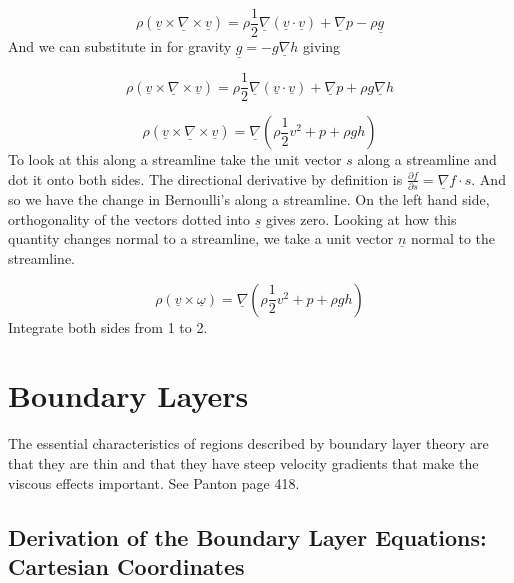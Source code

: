 \begin{equation*}
  \rho(\underline{v}\times\underline{\nabla}\times\underline{v})=\rho\frac{1}{2}\underline{\nabla}(\underline{v}\cdot\underline{v})+\underline{\nabla}p-\rho\underline{g}
\end{equation*}
And we can substitute in for gravity $\underline{g}=-g\underline{\nabla}h$ giving

\begin{equation*}
  \rho(\underline{v}\times\underline{\nabla}\times\underline{v})=\rho\frac{1}{2}\underline{\nabla}(\underline{v}\cdot\underline{v})+\underline{\nabla}p+\rho{}g\underline{\nabla}h
\end{equation*}

\begin{equation*}
  \rho(\underline{v}\times\underline{\nabla}\times\underline{v})=\underline{\nabla}\left(\rho\frac{1}{2}v^{2}+p+\rho{}gh\right)
\end{equation*}
To look at this along a streamline take the unit vector $s$ along a streamline and dot it onto both sides.
The directional derivative by definition is $\frac{\partial{}f}{\partial{}s}=\underline{\nabla}f\cdot s$.
And so we have the change in Bernoulli's along a streamline.
On the left hand side, orthogonality of the vectors dotted into $\underline{s}$ gives zero.
Looking at how this quantity changes normal to a streamline, we take a unit vector $\underline{n}$ normal to the streamline.

\begin{equation*}
  \rho(\underline{v}\times\underline{\omega})=\underline{\nabla}\left(\rho\frac{1}{2}v^{2}+p+\rho{}gh\right)
\end{equation*}
Integrate both sides from 1 to 2.

\chapter{Boundary Layers}

The essential characteristics of regions described by boundary layer theory are that they are thin and that they have steep velocity gradients that make the viscous effects important.
See Panton page 418.

\section{Derivation of the Boundary Layer Equations: Cartesian Coordinates}

